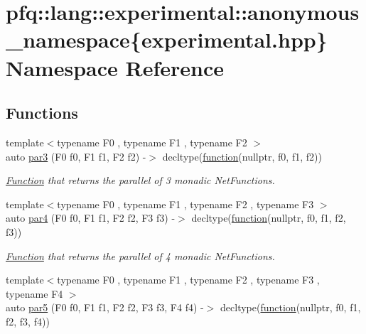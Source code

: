 \hypertarget{namespacepfq_1_1lang_1_1experimental_1_1anonymous__namespace_02experimental_8hpp_03}{}\section{pfq\+:\+:lang\+:\+:experimental\+:\+:anonymous\+\_\+namespace\{experimental.\+hpp\} Namespace Reference}
\label{namespacepfq_1_1lang_1_1experimental_1_1anonymous__namespace_02experimental_8hpp_03}
\subsection*{Functions}
\begin{DoxyCompactItemize}
\item 
{\footnotesize template$<$typename F0 , typename F1 , typename F2 $>$ }\\auto \hyperlink{namespacepfq_1_1lang_1_1experimental_1_1anonymous__namespace_02experimental_8hpp_03_af928726a0fff4b54e62f7bd017d3ef43}{par3} (F0 f0, F1 f1, F2 f2) -\/$>$ decltype(\hyperlink{namespacepfq_1_1lang_a1a4638059d700ae08d0ca63886ff2bb3}{function}(nullptr, f0, f1, f2))
\begin{DoxyCompactList}\small\item\em \hyperlink{structpfq_1_1lang_1_1Function}{Function} that returns the parallel of 3 monadic Net\+Functions. \end{DoxyCompactList}\item 
{\footnotesize template$<$typename F0 , typename F1 , typename F2 , typename F3 $>$ }\\auto \hyperlink{namespacepfq_1_1lang_1_1experimental_1_1anonymous__namespace_02experimental_8hpp_03_a9993b50a266ec8453f709a558ec40825}{par4} (F0 f0, F1 f1, F2 f2, F3 f3) -\/$>$ decltype(\hyperlink{namespacepfq_1_1lang_a1a4638059d700ae08d0ca63886ff2bb3}{function}(nullptr, f0, f1, f2, f3))
\begin{DoxyCompactList}\small\item\em \hyperlink{structpfq_1_1lang_1_1Function}{Function} that returns the parallel of 4 monadic Net\+Functions. \end{DoxyCompactList}\item 
{\footnotesize template$<$typename F0 , typename F1 , typename F2 , typename F3 , typename F4 $>$ }\\auto \hyperlink{namespacepfq_1_1lang_1_1experimental_1_1anonymous__namespace_02experimental_8hpp_03_a89f5774843ed66ad476ec417b41ece91}{par5} (F0 f0, F1 f1, F2 f2, F3 f3, F4 f4) -\/$>$ decltype(\hyperlink{namespacepfq_1_1lang_a1a4638059d700ae08d0ca63886ff2bb3}{function}(nullptr, f0, f1, f2, f3, f4))

\end{DoxyCompactItemize}
